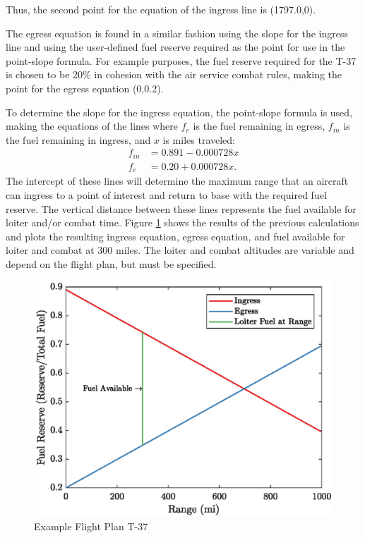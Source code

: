 Thus, the second point for the equation of the ingress line is (1797.0,0).\par
The egress equation is found in a similar fashion using the slope for the ingress line and using the user-defined fuel reserve required as the point for use in the point-slope formula. For example purposes, the fuel reserve required  for the T-37 is chosen to be 20\% in cohesion with the air service combat rules, making the point for the egress equation (0,0.2).\par
To determine the slope for the ingress equation, the point-slope formula is used, making the equations of the lines where $f_e$ is the fuel remaining in egress, $f_{in}$ is the fuel remaining in ingress, and $x$ is miles traveled:
\begin{equation}
\begin{aligned}
    f_{in} &= 0.891 - 0.000728x\\
    f_{e} &= 0.20 + 0.000728x.
\end{aligned}
\end{equation}
The intercept of these lines will determine the maximum range that an aircraft can ingress to a point of interest and return to base with the required fuel reserve. The vertical distance between these lines represents the fuel available for loiter and/or combat time. Figure \ref{fig:exT37} shows the results of the previous calculations and plots the resulting ingress equation, egress equation, and fuel available for loiter and combat at 300 miles. The loiter and combat altitudes are variable and depend on the flight plan, but must be specified.\par
\begin{figure} [H]
    \centering
    \includegraphics{Thesis/Method/ExampleFlightT37.eps}
    \caption{Example Flight Plan T-37}
    \label{fig:exT37}
\end{figure}

